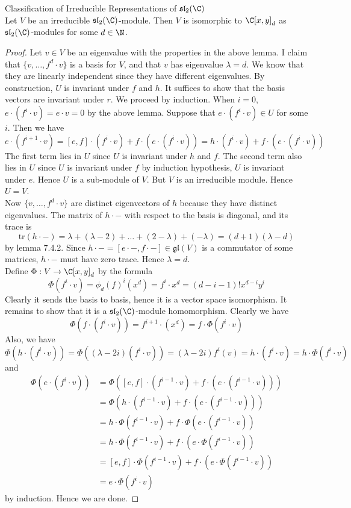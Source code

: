 \documentclass[a4paper]{article}
\begin{document}
\begin{thm}{Classification of Irreducible Representations of $\mathfrak{sl}_2(\C)$}{} \\Let $V$ be an irreducible $\mathfrak{sl}_2(\C)$-module. Then $V$ is isomorphic to $\C[x,y]_d$ as $\mathfrak{sl}_2(\C)$-modules for some $d\in\N$. 
\begin{proof}
Let $v\in V$ be an eigenvalue with the properties in the above lemma. I claim that $\{v,\dots,f^d\cdot v\}$ is a basis for $V$, and that $v$ has eigenvalue $\lambda=d$. We know that they are linearly independent since they have different eigenvalues. By construction, $U$ is invariant under $f$ and $h$. It suffices to show that the basis vectors are invariant under $r$. We proceed by induction. When $i=0$, $e\cdot (f^i\cdot v)=e\cdot v=0$ by the above lemma. Suppose that $e\cdot(f^i\cdot v)\in U$ for some $i$. Then we have $$e\cdot(f^{i+1}\cdot v)=[e,f]\cdot(f^i\cdot v)+f\cdot(e\cdot(f^i\cdot v))=h\cdot (f^i\cdot v)+f\cdot (e\cdot (f^i\cdot v))$$ The first term lies in $U$ since $U$ is invariant under $h$ and $f$. The second term also lies in $U$ since $U$ is invariant under $f$ by induction hypothesis, $U$ is invariant under $e$. Hence $U$ is a sub-module of $V$. But $V$ is an irreducible module. Hence $U=V$. \\

Now $\{v,\dots,f^d\cdot v\}$ are distinct eigenvectors of $h$ because they have distinct eigenvalues. The matrix of $h\cdot-$ with respect to the basis is diagonal, and its trace is $$\text{tr}(h\cdot -)=\lambda+(\lambda-2)+\dots+(2-\lambda)+(-\lambda)=(d+1)(\lambda-d)$$ by lemma 7.4.2. Since $h\cdot -=[e\cdot-,f\cdot-]\in\mathfrak{gl}(V)$ is a commutator of some matrices, $h\cdot-$ must have zero trace. Hence $\lambda=d$. \\

Define $\Phi:V\to\C[x,y]_d$ by the formula $$\Phi(f^i\cdot v)=\phi_d(f)^i(x^d)=f^i\cdot x^d=(d-i-1)!x^{d-i}y^i$$ Clearly it sends the basis to basis, hence it is a vector space isomorphism. It remains to show that it is a $\mathfrak{sl}_2(\C)$-module homomorphism. Clearly we have $$\Phi(f\cdot(f^i\cdot v))=f^{i+1}\cdot(x^d)=f\cdot\Phi(f^i\cdot v)$$ Also, we have $$\Phi(h\cdot (f^i\cdot v))=\Phi((\lambda-2i)(f^i\cdot v))=(\lambda-2i)f^i(v)=h\cdot(f^i\cdot v)=h\cdot\Phi(f^i\cdot v)$$ and 
\begin{align*}
\Phi(e\cdot(f^i\cdot v))&=\Phi([e,f]\cdot(f^{i-1}\cdot v)+f\cdot(e\cdot (f^{i-1}\cdot v)))\\
&=\Phi(h\cdot(f^{i-1}\cdot v)+f\cdot(e\cdot (f^{i-1}\cdot v)))\\
&=h\cdot\Phi(f^{i-1}\cdot v)+f\cdot\Phi(e\cdot(f^{i-1}\cdot v))\\
&=h\cdot\Phi(f^{i-1}\cdot v)+f\cdot(e\cdot\Phi(f^{i-1}\cdot v))\tag{Induction}\\
&=[e,f]\cdot\Phi(f^{i-1}\cdot v)+f\cdot(e\cdot\Phi(f^{i-1}\cdot v))\\
&=e\cdot\Phi(f^i\cdot v)
\end{align*}
by induction. Hence we are done. 
\end{proof}
\end{thm}
\end{document}
